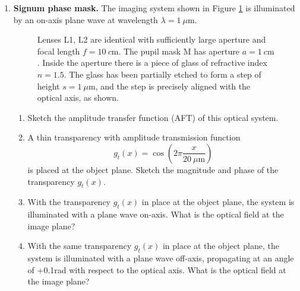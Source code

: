 \documentclass[main.tex]{subfiles}
\begin{document}
\begin{enumerate}
\item{\textbf{Signum phase mask.} The imaging system shown in Figure \ref{fig:f1} is illuminated by an on-axis plane wave at wavelength $\lambda=\SI{1}{\mu \meter}$. }


\begin{figure}
\centering{}
\caption{Lenses L1, L2 are identical with sufficiently large aperture and focal length $f=\SI{10}{c\metre}$. The pupil mask M has aperture $a=\SI{1}{c\metre}$. Inside the aperture there is a piece of glass of refractive index $n=1.5$. The glass has been partially etched to form a step of height $s=\SI{1}{\mu \metre}$, and the step is precisely aligned with the optical axis, as shown.}
\label{fig:f1}
\end{figure}

\begin{enumerate}
\item{Sketch the amplitude transfer function (AFT) of this optical system.}

\item{A thin transparency with amplitude transmission function}
$$g_t(x)=\cos \left( 2\pi \frac{x}{\SI{20}{\mu \metre} } \right)$$ 
is placed at the object plane. Sketch the magnitude and phase of the transparency $g_t(x)$.

\item{With the transparency $g_t(x)$ in place at the object plane, the system is illuminated with a plane wave on-axis. What is the optical field at the image plane?}

\item{With the same transparency $g_t(x)$ in place at the object plane, the system is illuminated with a plane wave off-axis, propagating at an angle of +0.1rad with respect to the optical axis. What is the optical field at the image plane?}


\end{enumerate}
\end{enumerate}
\end{document}
